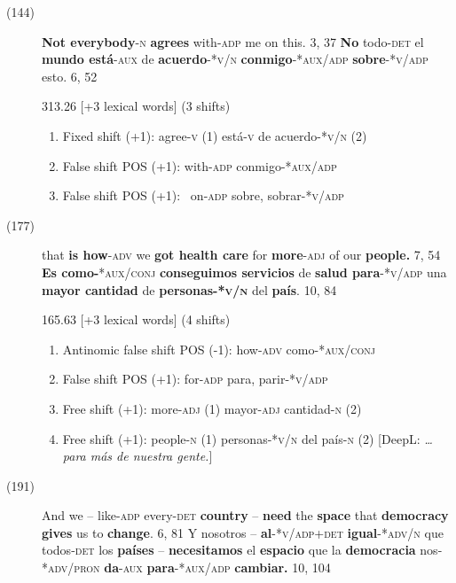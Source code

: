 \documentclass[output=paper]{langsci/langscibook}
\begin{document}
\begin{description}
  \item[(144)] \textbf{Not everybody}\textsc{-n} \textbf{agrees} with\textsc{-adp} me on this. 3, 37 \rightarrow \textbf{No} todo\textsc{-det} el \textbf{mundo está}\textsc{-aux} de \textbf{acuerdo}\textsc{-*v}/\textsc{n}\textbf{ conmigo}\textsc{-*aux/adp}\textbf{ sobre}\textsc{-*v/adp} esto. 6, 52

    313.26 [+3 lexical words] (3 shifts)

    \begin{enumerate}
      \item Fixed shift (+1): agree-\textsc{v} (1) \rightarrow está-\textsc{v} de acuerdo-*\textsc{v/n} (2)
      \item False shift POS (+1): with-\textsc{adp} \rightarrow conmigo\textsc{-*aux/adp}
      \item False shift POS (+1): \ on-\textsc{adp} \rightarrow sobre, sobrar-*\textsc{v/adp}
    \end{enumerate}

  \item[(177)] that \textbf{is how}\textsc{-adv} we \textbf{got health care} for \textbf{more}\textsc{-adj} of our \textbf{people. }7, 54 \rightarrow \textbf{Es como}\textbf{\textsc{-}}\textsc{*aux/conj} \textbf{conseguimos servicios} de \textbf{salud para}-*\textsc{v/adp} una \textbf{mayor cantidad} de \textbf{personas}\textbf{\textsc{-*v/n}} del \textbf{país}. 10, 84

    165.63 [+3 lexical words] (4 shifts)

    \begin{enumerate}
      \item Antinomic false shift POS (-1): how-\textsc{adv} \rightarrow como\textsc{-*aux/conj}
      \item False shift POS (+1): for-\textsc{adp} \rightarrow para, parir-*\textsc{v/adp}
      \item Free shift (+1): more-\textsc{adj} (1) \rightarrow mayor\textsc{-adj} cantidad-\textsc{n} (2)
      \item Free shift (+1): people-\textsc{n} (1) \rightarrow personas\textsc{-*v/n} del país-\textsc{n} (2) [DeepL: \textit{… para más de nuestra gente.}]
    \end{enumerate}

  \item[(191)] And we -- like\textsc{-adp} every\textsc{-det} \textbf{country} -- \textbf{need} the \textbf{space} that \textbf{democracy gives} us to \textbf{change}. 6, 81 \rightarrow Y nosotros -- \textbf{al}\textsc{-*v/adp+det} \textbf{igual}\textsc{-*adv/n} que todos\textsc{-det} los \textbf{países} -- \textbf{necesitamos} el \textbf{espacio} que la \textbf{democracia} nos\textsc{-*adv/pron} \textbf{da}\textsc{-aux} \textbf{para}\textsc{-*aux/adp} \textbf{cambiar.} 10, 104


\end{description}
\end{document}
